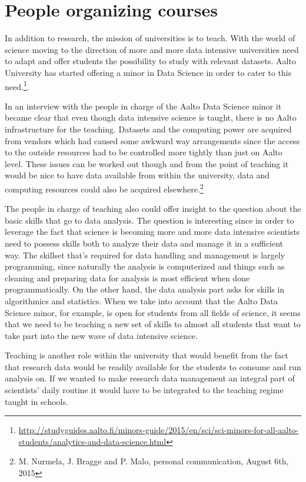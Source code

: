 \fi

\section{People organizing courses}

In addition to research, the mission of universities is to teach. With the
world of science moving to the direction of more and more data intensive
universities need to adapt and offer students the possibility to study with
relevant datasets. Aalto University has started offering a minor in Data
Science in order to cater to this need.\footnote{\url{http://studyguides.aalto.fi/minors-guide/2015/en/sci/sci-minors-for-all-aalto-students/analytics-and-data-science.html}}.

In an interview with the people in charge of the Aalto Data Science minor
it became clear that even though data intensive science is taught, there is no
Aalto infrastructure for the teaching. Datasets and the computing power are
acquired from vendors which had caused some awkward way arrangements since the
access to the outside resources had to be controlled more tightly than just
on Aalto level. These issues can be worked out though and from the point of
teaching it would be nice to have data available from within the university,
data and computing resources could also be acquired elsewhere.\footnote{M. Nurmela,
J. Bragge and P. Malo, personal communication, August 6th, 2015}

The people in charge of teaching also could offer insight to the question about
the basic skills that go to data analysis. The question is interesting since
in order to leverage the fact that science is becoming more and more data
intensive scientists need to possess skills both to analyze their data and
manage it in a sufficient way. The skillset that's required for data handling
and management is largely programming, since naturally the analysis is
computerized and things such as cleaning and preparing data for analysis is
most efficient when done programmatically. On the other hand, the data analysis
part asks for skills in algorithmics and statistics. When we take into account
that the Aalto Data Science minor, for example, is open for students from all
fields of science, it seems that we need to be teaching a new set of skills to
almost all students that want to take part into the new wave of data intensive
science.

\iffalse

Teaching is another role within the university that would benefit from the fact
that research data would be readily available for the students to consume and
run analysis on. If we wanted to make research data management an integral part
of scientists' daily routine it would have to be integrated to the teaching
regime taught in schools.

